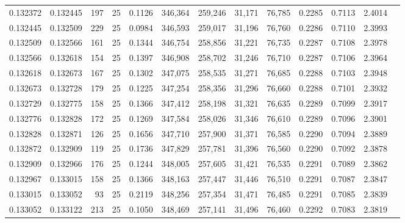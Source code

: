 \begin{tabular}{rrrrrrrrrrrrr}
0.132372 & 0.132445 &   197 &  25 &                                     0.1126 & 346,364 & 259,246 &  31,171 &  76,785 & 0.2285 & 0.7113 & 2.4014 \\
0.132445 & 0.132509 &   229 &  25 &                                     0.0984 & 346,593 & 259,017 &  31,196 &  76,760 & 0.2286 & 0.7110 & 2.3993 \\
0.132509 & 0.132566 &   161 &  25 &                                     0.1344 & 346,754 & 258,856 &  31,221 &  76,735 & 0.2287 & 0.7108 & 2.3978 \\
0.132566 & 0.132618 &   154 &  25 &                                     0.1397 & 346,908 & 258,702 &  31,246 &  76,710 & 0.2287 & 0.7106 & 2.3964 \\
0.132618 & 0.132673 &   167 &  25 &                                     0.1302 & 347,075 & 258,535 &  31,271 &  76,685 & 0.2288 & 0.7103 & 2.3948 \\
0.132673 & 0.132728 &   179 &  25 &                                     0.1225 & 347,254 & 258,356 &  31,296 &  76,660 & 0.2288 & 0.7101 & 2.3932 \\
0.132729 & 0.132775 &   158 &  25 &                                     0.1366 & 347,412 & 258,198 &  31,321 &  76,635 & 0.2289 & 0.7099 & 2.3917 \\
0.132776 & 0.132828 &   172 &  25 &                                     0.1269 & 347,584 & 258,026 &  31,346 &  76,610 & 0.2289 & 0.7096 & 2.3901 \\
0.132828 & 0.132871 &   126 &  25 &                                     0.1656 & 347,710 & 257,900 &  31,371 &  76,585 & 0.2290 & 0.7094 & 2.3889 \\
0.132872 & 0.132909 &   119 &  25 &                                     0.1736 & 347,829 & 257,781 &  31,396 &  76,560 & 0.2290 & 0.7092 & 2.3878 \\
0.132909 & 0.132966 &   176 &  25 &                                     0.1244 & 348,005 & 257,605 &  31,421 &  76,535 & 0.2291 & 0.7089 & 2.3862 \\
0.132967 & 0.133015 &   158 &  25 &                                     0.1366 & 348,163 & 257,447 &  31,446 &  76,510 & 0.2291 & 0.7087 & 2.3847 \\
0.133015 & 0.133052 &    93 &  25 &                                     0.2119 & 348,256 & 257,354 &  31,471 &  76,485 & 0.2291 & 0.7085 & 2.3839 \\
0.133052 & 0.133122 &   213 &  25 &                                     0.1050 & 348,469 & 257,141 &  31,496 &  76,460 & 0.2292 & 0.7083 & 2.3819 \\

\end{tabular}
